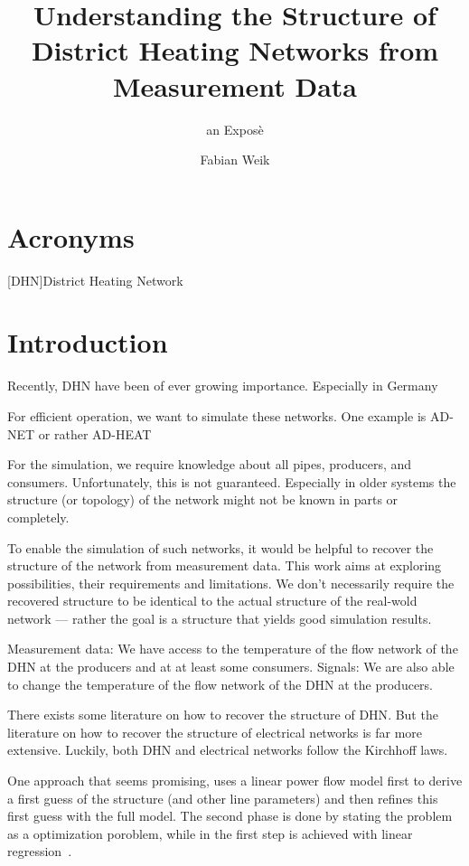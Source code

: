\documentclass{scrartcl}
\title{Understanding the Structure of District Heating Networks from Measurement Data}
\subtitle{an Exposè}
\author{Fabian Weik}
\begin{document}
    \maketitle

    \section{Acronyms}

    \begin{acronym}
        [DHN]{District Heating Network}
    \end{acronym}

    \section{Introduction}

    Recently, \ac{DHN} have been of ever growing importance.
    Especially in Germany

    For efficient operation, we want to simulate these networks.
    One example is AD-NET or rather AD-HEAT

    For the simulation, we require knowledge about all pipes, producers, and consumers.
    Unfortunately, this is not guaranteed.
    Especially in older systems the structure (or topology) of the network might not be known in parts or completely.

    To enable the simulation of such networks, it would be helpful to recover the structure of the network from measurement data.
    This work aims at exploring possibilities, their requirements and limitations.
    We don't necessarily require the recovered structure to be identical to the actual structure of the real-wold network --- rather  the goal is a structure that yields good simulation results.

    Measurement data: We have access to the temperature of the flow network of the \ac{DHN} at the producers and at at least some consumers.
    Signals: We are also able to change the temperature of the flow network of the \ac{DHN} at the producers.

    There exists some literature on how to recover the structure of \ac{DHN}.
    But the literature on how to recover the structure of electrical networks is far more extensive.
    Luckily, both \ac{DHN} and electrical networks follow the Kirchhoff laws.

    One approach that seems promising, uses a linear power flow model first to derive a first guess of the structure (and other line parameters) and then refines this first guess with the full model.
    The second phase is done by stating the problem as a optimization poroblem, while in the first step is achieved with linear regression~\cite{wang2024identification}.

    
    
\end{document}

